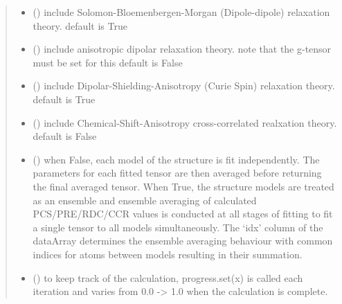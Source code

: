\documentclass[a4paper,10pt,english,openany,oneside]{sphinxmanual}
\begin{document}
\begin{fulllineitems}
\begin{quote}
\begin{description}
\begin{itemize}
\item {} 
 (\sphinxstyleliteralemphasis{\sphinxupquote{, }}) \textendash{} include Solomon-Bloemenbergen-Morgan (Dipole-dipole) relaxation theory.
default is True

\item {} 
 (\sphinxstyleliteralemphasis{\sphinxupquote{, }}) \textendash{} include anisotropic dipolar relaxation theory.
note that the g-tensor must be set for this
default is False

\item {} 
 (\sphinxstyleliteralemphasis{\sphinxupquote{, }}) \textendash{} include Dipolar-Shielding-Anisotropy (Curie Spin) relaxation theory.
default is True

\item {} 
 (\sphinxstyleliteralemphasis{\sphinxupquote{, }}) \textendash{} include Chemical-Shift-Anisotropy cross-correlated realxation theory.
default is False

\item {} 
 (\sphinxstyleliteralemphasis{\sphinxupquote{, }}) \textendash{} when False, each model of the structure is fit independently.
The parameters for each fitted tensor are then averaged before
returning the final averaged tensor.
When True, the structure models are treated as an ensemble and
ensemble averaging of calculated PCS/PRE/RDC/CCR values is
conducted at all stages of fitting to fit a single tensor to all
models simultaneously. The ‘idx’ column of the dataArray
determines the ensemble averaging behaviour with common indices
for atoms between models resulting in their summation.

\item {} 
 (\sphinxstyleliteralemphasis{\sphinxupquote{, }}) \textendash{} to keep track of the calculation, progress.set(x) is called each
iteration and varies from 0.0 -\textgreater{} 1.0 when the calculation is complete.


\end{itemize}
\end{description}
\end{quote}
\end{fulllineitems}
\end{document}
